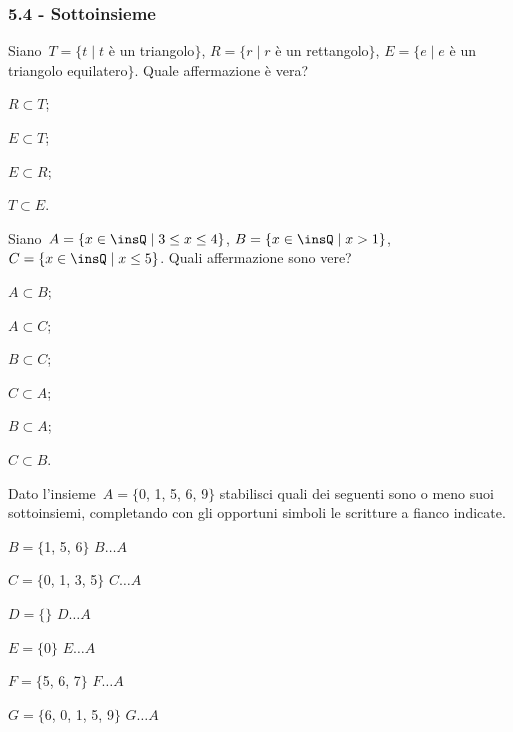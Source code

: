 \subsubsection*{5.4 - Sottoinsieme}

\begin{esercizio}[\Ast]
\label{ese:5.41}
 Siano~$T=\{t\mid t$ è un triangolo$\}$, $R=\{r\mid r$ è un rettangolo$\}$,
$E=\{e\mid e$ è un triangolo equilatero$\}$. Quale affermazione è vera?
\begin{multicols}{4}
\begin{enumeratea}
\item $R\subset T$;
\item $E\subset T$;
\item $E\subset R$;
\item $T\subset E$.
\end{enumeratea}
\end{multicols}
\end{esercizio}

\begin{esercizio}[\Ast]
\label{ese:5.42}
 Siano~$A=\{x\in \insQ \mid 3\le x \le 4\}$, $B=\{x\in \insQ \mid x>1\}$, $C=\{x\in \insQ \mid x \le 5\}$. Quali affermazione sono vere?
\begin{multicols}{3}
\begin{enumeratea}
\item $A\subset B$;
\item $A\subset C$;
\item $B\subset C$;
\item $C\subset A$;
\item $B\subset A$;
\item $C\subset B$.
\end{enumeratea}
\end{multicols}
\end{esercizio}
\begin{esercizio}
\label{ese:5.43}
Dato l'insieme~$A=\{$0, 1, 5, 6, 9$\}$ stabilisci
quali dei seguenti sono o meno suoi sottoinsiemi, completando con gli
opportuni simboli le scritture a fianco indicate.
\begin{multicols}{2}
\TabPositions{3cm}
\begin{enumeratea}
\item $B=\{$1, 5, 6$\}$ \tab $B\ldots A$
\item $C=\{$0, 1, 3, 5$\}$ \tab $C \ldots A$
\item $D=\{ \}$ \tab $D \ldots A$
\item $E=\{0\}$ \tab $E \ldots A$
\item $F=\{$5, 6, 7$\}$ \tab $F \ldots A$
\item $G=\{$6, 0, 1, 5, 9$\}$ \tab $G\ldots A$
\end{enumeratea}
\end{multicols}
\end{esercizio}


